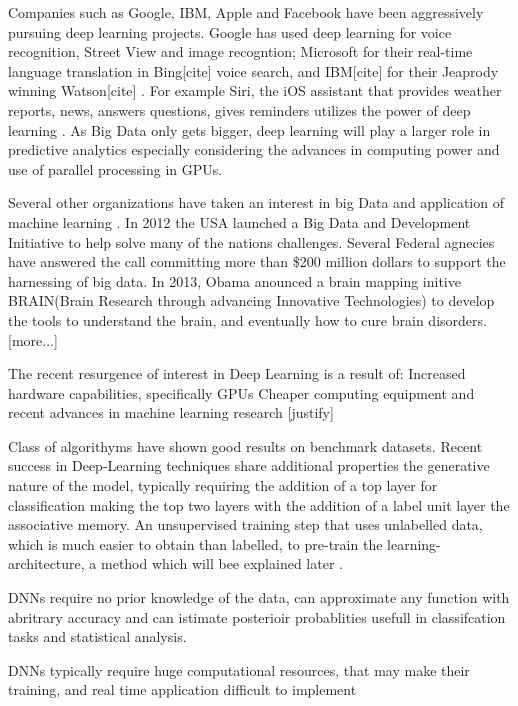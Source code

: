 Companies such as Google, IBM, Apple and Facebook have been aggressively pursuing deep learning projects.
Google has used deep learning for voice recognition, Street View and image recogntion; Microsoft for their real-time language translation in Bing[cite] voice search, and IBM[cite] for their Jeaprody winning Watson[cite] \citep{chen2014big}.
For example Siri, the iOS assistant that provides weather reports, news, answers questions, gives reminders utilizes the power of deep learning \citep{chen2014big}.
As Big Data only gets bigger, deep learning will play a larger role in predictive analytics especially considering the advances in computing power and use of parallel processing in GPUs\citep{chen2014big}.

Several other organizations have taken an interest in big Data and application of machine learning\citep{chen2014big} .
In 2012 the USA launched a Big Data and Development Initiative to help solve many of the nations challenges.
Several Federal agnecies have answered the call committing more than \$200 million dollars to support the harnessing of big data.
In 2013, Obama anounced a brain mapping initive BRAIN(Brain Research through advancing Innovative Technologies) to develop the tools to understand the brain, and eventually how to cure brain disorders.
[more...]

The recent resurgence of interest in Deep Learning is a result of:
Increased hardware capabilities, specifically GPUs
Cheaper computing equipment
and recent advances in machine learning research [justify]\cite{dengthree}

Class of algorithyms have shown good results on benchmark datasets\citep{bengio2009advances}.
Recent success in Deep-Learning techniques share additional properties
the generative nature of the model, typically requiring the addition of a top layer for classification\citep{dengthree} making the top two layers with the addition of a label unit layer the associative memory\citep{mo2012survey}.
An unsupervised training step that uses unlabelled data, which is much easier to obtain than labelled, to pre-train the learning-architecture, a method which will bee explained later \citep{dengthree}.

DNNs require no prior knowledge of the data, can approximate any function with abritrary accuracy and can istimate posterioir probablities usefull in classifcation tasks and statistical analysis\citep{bengio2009advances}.

DNNs typically require huge computational resources, that may make their training, and real time application difficult to implement\citep{goyal2014object}

